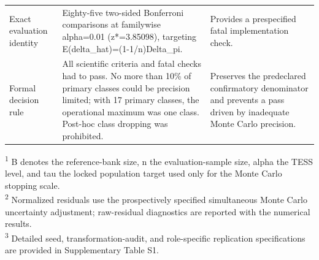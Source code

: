 \begin{table}[htbp]
\begin{tabularx}{\textwidth}{p{} X X}
Exact evaluation identity & Eighty-five two-sided Bonferroni comparisons at familywise alpha=0.01 (z*=3.85098), targeting E(delta\_hat)=(1-1/n)Delta\_pi. & Provides a prespecified fatal implementation check. \\
Formal decision rule & All scientific criteria and fatal checks had to pass. No more than 10\% of primary classes could be precision limited; with 17 primary classes, the operational maximum was one class. Post-hoc class dropping was prohibited. & Preserves the predeclared confirmatory denominator and prevents a pass driven by inadequate Monte Carlo precision. \\
\bottomrule
\end{tabularx}
\begin{minipage}{\textwidth}
\footnotesize
\textsuperscript{1} B denotes the reference-bank size, n the evaluation-sample size, alpha the TESS level, and tau the locked population target used only for the Monte Carlo stopping scale.\\
\textsuperscript{2} Normalized residuals use the prospectively specified simultaneous Monte Carlo uncertainty adjustment; raw-residual diagnostics are reported with the numerical results.\\
\textsuperscript{3} Detailed seed, transformation-audit, and role-specific replication specifications are provided in Supplementary Table S1.\\
\end{minipage}
\end{table}
